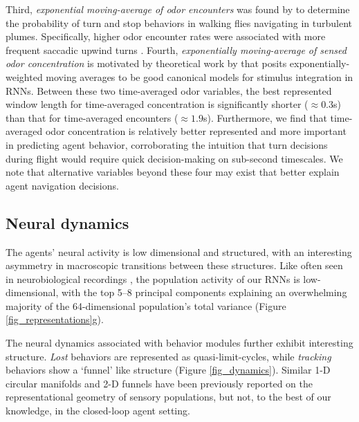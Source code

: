 \documentclass[5p,twocolumn,authoryear]{elsarticle}
\begin{document}
Third, \textit{exponential moving-average of odor encounters} was found by \cite{demir2020walking} to determine the probability of turn and stop behaviors in walking flies navigating in turbulent plumes.
Specifically, higher odor encounter rates were associated with more frequent saccadic upwind turns
\citep{celani2020olfactory}.
Fourth, \textit{exponentially moving-average of sensed odor concentration}  
is motivated by theoretical work by \cite{maheswaranathan2019reverse} that posits exponentially-weighted moving averages to be good canonical models for stimulus integration in RNNs.
Between these two time-averaged odor variables, the best represented window length for time-averaged concentration is significantly shorter ($\approx0.3$s) than that for time-averaged encounters ($\approx 1.9$s). 
Furthermore, we find that time-averaged odor concentration is relatively better represented and more important 
in predicting agent behavior, 
corroborating the intuition that turn decisions during flight would require quick decision-making on sub-second timescales.
We note that alternative variables beyond these four may exist that better explain agent navigation decisions.

\subsection*{Neural dynamics}
The agents' neural activity is low dimensional and structured, with an interesting  asymmetry in macroscopic transitions between these structures.
Like often seen in neurobiological recordings \citep{pang2016dimensionality,cunningham2014dimensionality}, the population activity of our RNNs is low-dimensional, with the top 5--8 principal components explaining an overwhelming majority of the 64-dimensional population's total variance (Figure \ref{fig_representations}g).

The neural dynamics associated with behavior modules further exhibit interesting structure.
\textit{Lost} behaviors are represented as quasi-limit-cycles, while \textit{tracking} behaviors show a `funnel' like structure (Figure \ref{fig_dynamics}).
Similar 1-D circular manifolds and 2-D funnels \citep{vyas2020computation,kriegeskorte2021neural} have been previously reported on the representational geometry of sensory populations, but not, to the best of our knowledge, in the closed-loop agent setting.


\end{document}
